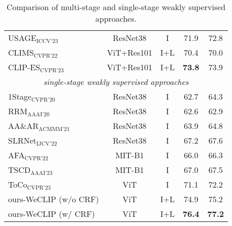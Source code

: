 \begin{table}[ht]
\begin{tabular}{l c c c c}
USAGE$_{\text{ICCV'23}}$~\cite{35} & ResNet38 & I & 71.9 & 72.8 \\
CLIMS$_{\text{CVPR'22}}$~\cite{51} & ViT+Res101 & I+L & 70.4 & 70.0 \\
CLIP-ES$_{\text{CVPR'23}}$~\cite{29} & ViT+Res101 & I+L & \textbf{73.8} & 73.9 \\
\hline
\multicolumn{5}{c}{\textit{single-stage weakly supervised approaches}} \\
1Stage$_{\text{CVPR'20}}$~\cite{3} & ResNet38 & I & 62.7 & 64.3 \\
RRM$_{\text{AAAI'20}}$~\cite{55} & ResNet38 & I & 62.6 & 62.9 \\
AA\&AR$_{\text{ACMMM'21}}$~\cite{61} & ResNet38 & I & 63.9 & 64.8 \\
SLRNet$_{\text{IJCV'22}}$~\cite{34} & ResNet38 & I & 67.2 & 67.6 \\
AFA$_{\text{CVPR'22}}$~\cite{39} & MIT-B1 & I & 66.0 & 66.3 \\
TSCD$_{\text{AAAI'23}}$~\cite{53} & MIT-B1 & I & 67.0 & 67.5 \\
ToCo$_{\text{CVPR'23}}$~\cite{40} & ViT & I & 71.1 & 72.2 \\
\hline
ours-WeCLIP (w/o CRF) & ViT & I+L & 74.9 & 75.2 \\
ours-WeCLIP (w/ CRF)  & ViT & I+L & \textbf{76.4} & \textbf{77.2} \\
\hline
\end{tabular}
\caption{Comparison of multi-stage and single-stage weakly supervised approaches.}
\end{table}

